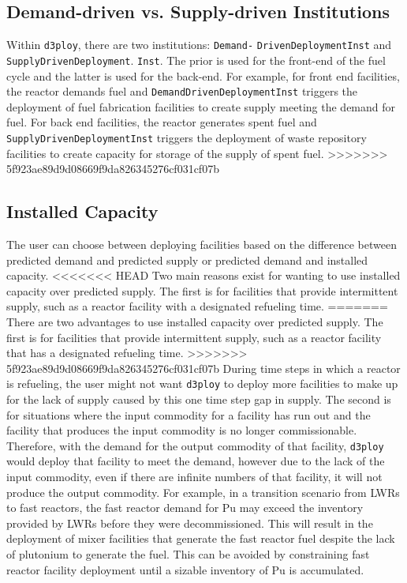 \documentclass[11pt,letterpaper]{article}
\newcommand{\deploy}{\texttt{d3ploy}\xspace}%
\begin{document}
\subsection{\textbf{Demand-driven vs. Supply-driven Institutions}}
Within \deploy, there are two institutions: \texttt{Demand-}
\texttt{DrivenDeploymentInst} and \texttt{SupplyDrivenDeployment}. 
\texttt{Inst}. 
The prior is used for the front-end of the fuel cycle and the latter is used 
for the back-end. 
For example, for front end facilities, the reactor demands 
fuel and \texttt{DemandDrivenDeploymentInst} triggers the deployment 
of fuel fabrication facilities to create supply meeting the demand 
for fuel. 
For back end facilities, the reactor generates spent fuel 
and \texttt{SupplyDrivenDeploymentInst} triggers the deployment of 
waste repository facilities to create capacity for storage of the supply 
of spent fuel. 
>>>>>>> 5f923ae89d9d08669f9da826345276cf031cf07b

\subsection{\textbf{Installed Capacity}}
The user can choose between deploying facilities based on the difference 
between predicted demand and predicted supply or predicted demand and 
installed capacity. 
<<<<<<< HEAD
Two main reasons exist for wanting to use installed capacity over predicted 
supply. 
The first is for facilities that provide intermittent supply, such as a 
reactor facility with a designated refueling time. 
=======
There are two advantages to use installed capacity over predicted 
supply. 
The first is for facilities that provide intermittent supply, such as a 
reactor facility that has a designated refueling time. 
>>>>>>> 5f923ae89d9d08669f9da826345276cf031cf07b
During time steps in which a reactor is refueling, the user might not 
want \deploy to deploy more facilities to make up for the lack of supply
caused by this one time step gap in supply. 
The second is for situations where the input commodity for a facility has
run out and the facility that produces the input commodity 
is no longer commissionable. 
Therefore, with the demand for the output commodity of that facility, \deploy
would deploy that facility to meet the demand, however due to the lack of 
the input commodity, even if there are infinite numbers of that facility, 
it will not produce the output commodity. 
For example, in a transition scenario from LWRs to fast reactors, the fast 
reactor demand for Pu may exceed the inventory provided by LWRs before 
they were decommissioned. 
This will result in the deployment of mixer facilities that generate the 
fast reactor fuel despite the lack of plutonium to generate the fuel. 
This can be avoided by constraining fast reactor facility deployment 
until a sizable inventory of Pu is accumulated. 
\end{document}
